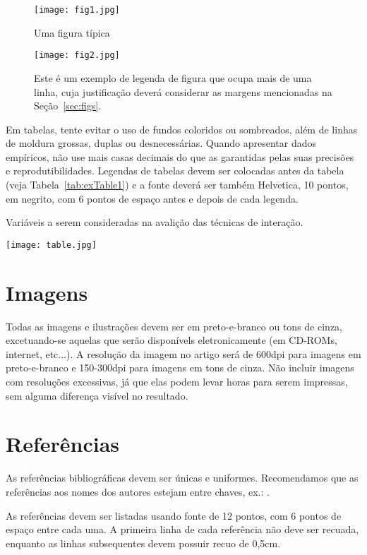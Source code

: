 \documentclass[12pt]{article}
\begin{document}
\begin{figure}[ht]
\centering
\texttt{[image: fig1.jpg]}
\caption{Uma figura típica}
\label{fig:exampleFig1}
\end{figure}

\begin{figure}[ht]
\centering
\texttt{[image: fig2.jpg]}
\caption{Este é um exemplo de legenda de figura que ocupa mais de uma linha, cuja justificação deverá considerar as margens mencionadas na Seção~\ref{sec:figs}.}
\label{fig:exampleFig2}
\end{figure}

Em tabelas, tente evitar o uso de fundos coloridos ou sombreados, além de linhas de moldura grossas, duplas ou desnecessárias. Quando apresentar dados empíricos, não use mais casas decimais do que as garantidas pelas suas precisões e reprodutibilidades. Legendas de tabelas devem ser colocadas antes da tabela (veja Tabela~\ref{tab:exTable1}) e a fonte deverá ser também Helvetica, 10 pontos, em negrito, com 6 pontos de espaço antes e depois de cada legenda.


\begin{table}[ht]
\centering
\caption{Variáveis a serem consideradas na avalição das técnicas de interação.}
\label{tab:exTable1}
\texttt{[image: table.jpg]}
\end{table}

\section{Imagens}

Todas as imagens e ilustrações devem ser em preto-e-branco ou tons de cinza, excetuando-se aquelas que serão disponívels eletronicamente (em CD-ROMs, internet, etc...). A resolução da imagem no artigo será de 600dpi para imagens em preto-e-branco e 150-300dpi para imagens em tons de cinza. Não incluir imagens com resoluções excessivas, já que elas podem levar horas para serem impressas, sem alguma diferença visível no resultado.

\section{Referências}

As referências bibliográficas devem ser únicas e uniformes. Recomendamos que as referências aos nomes dos autores estejam entre chaves, ex.: \cite{knuth:84}.

As referências devem ser listadas usando fonte de 12 pontos, com 6 pontos de espaço entre cada uma. A primeira linha de cada referência não deve ser recuada, enquanto as linhas subsequentes devem possuir recuo de 0,5cm.




\end{document}
